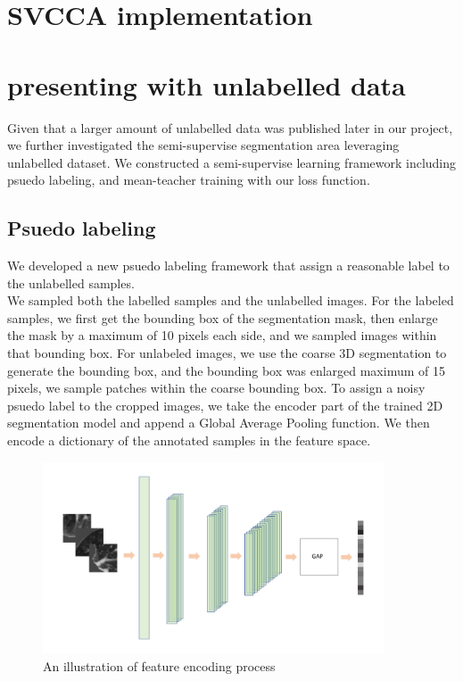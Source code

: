 \section{SVCCA implementation}

\section{presenting with unlabelled data}
Given that a larger amount of unlabelled data was published later in our project, we further investigated the semi-supervise segmentation area leveraging unlabelled dataset. We constructed a semi-supervise learning framework including psuedo labeling, and mean-teacher training with our loss function.
\subsection{Psuedo labeling}
We developed a new psuedo labeling framework that assign a reasonable label to the unlabelled samples.\\

We sampled both the labelled samples and the unlabelled images. For the labeled samples, we first get the bounding box of the segmentation mask, then enlarge the mask by a maximum of 10 pixels each side, and we sampled images within that bounding box.
For unlabeled images, we use the coarse 3D segmentation to generate the bounding box, and the bounding box was enlarged maximum of 15 pixels, we sample patches within the coarse bounding box.
To assign a noisy psuedo label to the cropped images, we take the encoder part of the trained 2D segmentation model and append a Global Average Pooling function. We then encode a dictionary of the annotated samples in the feature space.\\
\begin{figure}
	\centering
	\includegraphics[width=0.9\textwidth]{img/semi-experiment/latent-space}
	\caption{An illustration of feature encoding process}
\end{figure}

